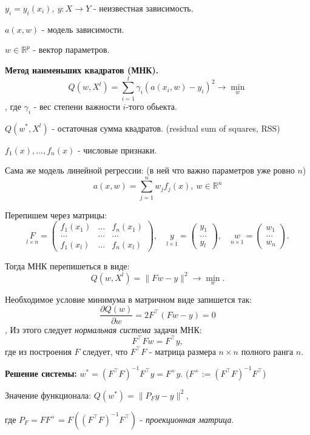 $y_i = y_i(x_i), \ y: X \rightarrow Y$ - неизвестная зависимость.

$a(x, w)$ - модель зависимости.

$w \in \mathbb{R}^p$ - вектор параметров.

\noindent\textbf{Метод наименьших квадратов (МНК).}
$$Q(w, X^l) = \sum_{i = 1}^l \gamma_i(a(x_i, w) - y_i)^2 \rightarrow \min_w$$,
где $\gamma_i$ - вес степени важности $i$-того обьекта.

$Q(w^*, X^l)$ - остаточная сумма квадратов. (residual sum of squares, RSS)

$f_1(x), ..., f_n(x)$ - числовые признаки.

Сама же модель линейной регрессии: (в ней что важно параметров уже ровно $n$)
$$a(x, w) = \sum_{j = 1}^nw_jf_j(x), \ w \in \mathbb{R}^n$$

Перепишем через матрицы:
$$\underset{l \times n}{F} = \begin{pmatrix}
    f_1(x_1) & \dots & f_n(x_1)  \\
    \dots    & \dots & \dots     \\
    f_1(x_l) & \dots & f_n(x_l)
  \end{pmatrix}, \quad \underset{l \times 1}{y} = \begin{pmatrix}
    y_1   \\
    \dots \\
    y_l
  \end{pmatrix}, \quad \underset{n \times 1}{w} = \begin{pmatrix}
    w_1   \\
    \dots \\
    w_n
  \end{pmatrix}.$$

Тогда МНК перепишеться в виде:
$$Q(w, X^l) = \|Fw - y\|^2 \rightarrow \min_w.$$

Необходимое условие минимума в матричном виде запишется так:
$$\frac{\partial Q(w)}{\partial w} = 2 F^\top (Fw - y) = 0$$,
Из этого следует \textit{нормальная система} задачи МНК:
$$F^\top Fw = F^\top y,$$
где из построения $F$ следует, что $F^\top F$ - матрица размера $n \times n$ полного ранга $n$.

\noindent\textbf{Решение системы:} $w^* = (F^\top F)^{-1}F^\top y = F^+ y$.
($F^+ := (F^\top F)^{-1}F^\top$)

Значение функционала: $Q(w^*) = \|P_Fy - y\|^2$,

где $P_F = FF^+ = F((F^\top F)^{-1}F^\top)$ - \textit{проекционная матрица}.

